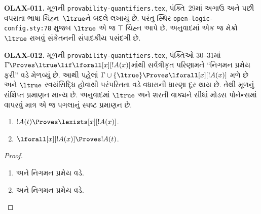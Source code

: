 \begin{editorial}
\textbf{OLAX-011.} મૂળની \texttt{provability-quantifiers.tex}, પંક્તિ~29માં અગાઉ અને પછી વપરાતા ભાષા-ચિહ્ન~$\ltrue$ને બદલે \texttt{\string\top} લખાયું છે. પરંતુ સ્થિર \texttt{open-logic-config.sty:78} મુજબ $\ltrue$ એ જ $\top$ ચિહ્ન આપે છે. અનુવાદમાં એક જ મેક્રો $\ltrue$ રાખવું સંકેતનની સંપાદકીય પસંદગી છે.
\end{editorial}

\begin{editorial}
\textbf{OLAX-012.} મૂળની \texttt{provability-quantifiers.tex}, પંક્તિઓ 30--31માં $\Gamma\Proves\ltrue\lif\lforall[x][!A(x)]$માંથી સર્વત્રીકૃત પરિણામને ``નિગમન પ્રમેય ફરી'' વડે મેળવ્યું છે. આથી પહેલાં $\Gamma\cup\{\ltrue\}\Proves\lforall[x][!A(x)]$ મળે છે અને $\ltrue$ સ્વયંસિદ્ધિ હોવાથી પરંપરિતતા વડે વધારાની ધારણા દૂર થાય છે. તેથી મૂળનું સંક્ષિપ્ત પ્રમાણન માન્ય છે. અનુવાદમાં $\ltrue$ અને શરતી વાક્યને સીધાં મોડસ પોનેન્સમાં વાપરવું માત્ર એ જ પગલાનું સ્પષ્ટ પ્રમાણન છે.
\end{editorial}

\begin{prop}
\begin{enumerate}
\item $!A(t) \Proves \lexists[x][!A(x)]$.

\item $\lforall[x][!A(x)] \Proves !A(t)$.
\end{enumerate}
\end{prop}

\begin{proof}
\begin{enumerate}
\item {} અને નિગમન પ્રમેય વડે.
\item {} અને નિગમન પ્રમેય વડે.
\end{enumerate}
\end{proof}
\endgroup


\begingroup
\makeatletter{}\makeatother


\label{guunit:OLP-0124}


